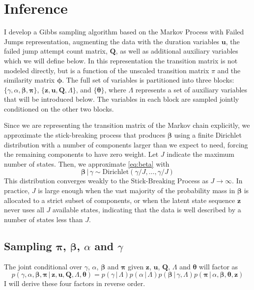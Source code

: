 \documentclass[12pt,letterpaper]{report}
\newcommand{\given}{\, \vert \,}
\newcommand{\bQ}{\mathbf{Q}}
\newcommand{\bz}{\mathbf{z}}
\newcommand{\bu}{\mathbf{u}}
\newcommand{\bbeta}{\boldsymbol{\beta}}
\newcommand{\btheta}{\boldsymbol{\theta}}
\newcommand{\bpi}{\boldsymbol{\pi}}
\newcommand{\bphi}{\boldsymbol{\phi}}
\begin{document}
\section{Inference}
\label{sec:inference}

I develop a Gibbs sampling algorithm based on the Markov Process with
Failed Jumps representation, augmenting the data with the duration
variables $\bu$, the failed jump attempt count matrix, $\bQ$, as well
as additional auxiliary variables which we will define below.
In this representation the transition matrix is not modeled
directly, but is a function of the unscaled transition matrix $\pi$
and the similarity matrix $\bphi$.  The full set of variables is
partitioned into three blocks: $\{\gamma, \alpha, \bbeta, \bpi\}$,
$\{\bz, \bu, \bQ, \Lambda\}$, and $\{\btheta\}$, where $\Lambda$
represents a set of auxiliary variables that will be introduced
below.  The variables in each block are sampled jointly 
conditioned on the other two blocks.

Since we are representing the transition matrix of the Markov chain
explicitly, we approximate the stick-breaking process that produces
$\bbeta$ using a finite Dirichlet distribution with a number of 
components larger than we expect to need, forcing the remaining 
components to have zero weight.  
Let $J$ indicate the maximum number of states.  Then,
we approximate \eqref{eq:beta} with
\begin{equation}
  \label{eq:28}
  \bbeta \given \gamma \sim \mathrm{Dirichlet}(\gamma / J, \dots,
  \gamma / J)
\end{equation}
This distribution converges weakly to the Stick-Breaking Process as $J \to
\infty$.  In practice, $J$ is large enough when the vast majority of the
probability mass in $\bbeta$ is allocated to a strict subset of
components, or when the latent state sequence $\bz$ never uses all $J$
available states, indicating that the data is well described by a number of
states less than $J$.

\subsection{Sampling $\bpi$, $\bbeta$, $\alpha$ and $\gamma$}
\label{sec:sampling-pi}

The joint conditional over $\gamma$, $\alpha$, $\bbeta$ and $\bpi$
given $\bz$, $\bu$, $\bQ$, $\Lambda$ and $\btheta$ will factor as
\begin{equation}
  \label{eq:46}
  p(\gamma, \alpha, \bbeta, \bpi \given \bz, \bu, \bQ, \Lambda, \btheta) = p(\gamma \given
  \Lambda) p(\alpha \given \Lambda) p(\bbeta \given \gamma, \Lambda) p(\bpi
  \given \alpha, \bbeta, \btheta, \bz)
\end{equation}
I will derive these four factors in reverse order.
\end{document}
